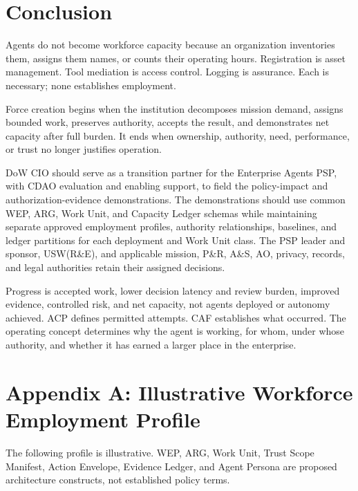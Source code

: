 \documentclass[11pt]{article}
\begin{document}
\hypertarget{conclusion}{%
\section{Conclusion}\label{conclusion}}

Agents do not become workforce capacity because an organization
inventories them, assigns them names, or counts their operating hours.
Registration is asset management. Tool mediation is access control.
Logging is assurance. Each is necessary; none establishes employment.

Force creation begins when the institution decomposes mission demand,
assigns bounded work, preserves authority, accepts the result, and
demonstrates net capacity after full burden. It ends when ownership,
authority, need, performance, or trust no longer justifies operation.

DoW CIO should serve as a transition partner for the Enterprise Agents
PSP, with CDAO evaluation and enabling support, to field the
policy-impact and authorization-evidence demonstrations. The
demonstrations should use common WEP, ARG, Work Unit, and Capacity
Ledger schemas while maintaining separate approved employment profiles,
authority relationships, baselines, and ledger partitions for each
deployment and Work Unit class. The PSP leader and sponsor, USW(R\&E),
and applicable mission, P\&R, A\&S, AO, privacy, records, and legal
authorities retain their assigned decisions.

Progress is accepted work, lower decision latency and review burden,
improved evidence, controlled risk, and net capacity, not agents
deployed or autonomy achieved. ACP defines permitted attempts. CAF
establishes what occurred. The operating concept determines why the
agent is working, for whom, under whose authority, and whether it has
earned a larger place in the enterprise.

\hypertarget{appendix-a-illustrative-workforce-employment-profile}{%
\section{Appendix A: Illustrative Workforce Employment
Profile}\label{appendix-a-illustrative-workforce-employment-profile}}

The following profile is illustrative. WEP, ARG, Work Unit, Trust Scope
Manifest, Action Envelope, Evidence Ledger, and Agent Persona are
proposed architecture constructs, not established policy terms.
\end{document}

